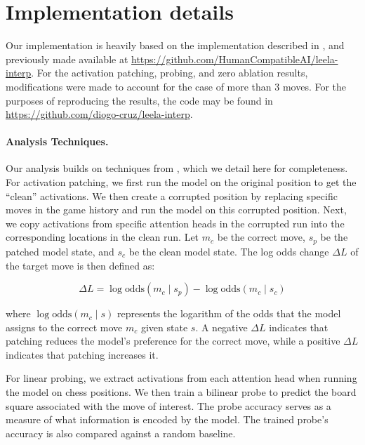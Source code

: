 \documentclass{article}
\begin{document}
\clearpage
\section{Implementation details}\label{sec:implementation_details}

Our implementation is heavily based on the implementation described in \citet{jenner2024evidence}, and previously made available at \url{https://github.com/HumanCompatibleAI/leela-interp}. For the activation patching, probing, and zero ablation results, modifications were made to account for the case of more than 3 moves. For the purposes of reproducing the results, the code may be found in \url{https://github.com/diogo-cruz/leela-interp}.

\paragraph{Analysis Techniques.} Our analysis builds on techniques from \citet{jenner2024evidence}, which we detail here for completeness. For activation patching, we first run the model on the original position to get the ``clean'' activations. We then create a corrupted position by replacing specific moves in the game history and run the model on this corrupted position. Next, we copy activations from specific attention heads in the corrupted run into the corresponding locations in the clean run.
Let $m_c$ be the correct move, $s_p$ be the patched model state, and $s_c$ be the clean model state. The log odds change $\Delta L$ of the target move is then defined as:

\begin{equation}
    \Delta L = \log\text{odds}(m_c \mid s_p) - \log\text{odds}(m_c \mid s_c)
\end{equation}

where $\log\text{odds}(m_c \mid s)$ represents the logarithm of the odds that the model assigns to the correct move $m_c$ given state $s$. A negative $\Delta L$ indicates that patching reduces the model's preference for the correct move, while a positive $\Delta L$ indicates that patching increases it.

For linear probing, we extract activations from each attention head when running the model on chess positions. We then train a bilinear probe to predict the board square associated with the move of interest. The probe accuracy serves as a measure of what information is encoded by the model. The trained probe's accuracy is also compared against a random baseline.
\end{document}
